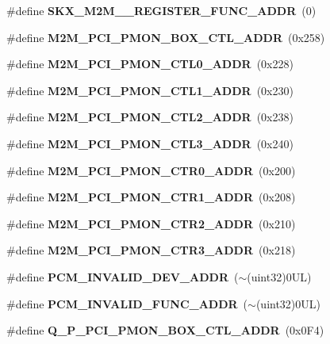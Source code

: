 \begin{DoxyCompactItemize}
\mbox{\label{types_8h_a770d64d720646aeb175e44d886acb365}} 
\#define {\bfseries S\+K\+X\+\_\+\+M2\+M\+\_\+\_\+\+R\+E\+G\+I\+S\+T\+E\+R\+\_\+\+F\+U\+N\+C\+\_\+\+A\+D\+DR}~(0)
\item 
\mbox{\label{types_8h_af57cf6bd9e16d3a69f2609ce1d9c52d2}} 
\#define {\bfseries M2\+M\+\_\+\+P\+C\+I\+\_\+\+P\+M\+O\+N\+\_\+\+B\+O\+X\+\_\+\+C\+T\+L\+\_\+\+A\+D\+DR}~(0x258)
\item 
\mbox{\label{types_8h_a2fd1d804ae58e1dd76bb7a8747714256}} 
\#define {\bfseries M2\+M\+\_\+\+P\+C\+I\+\_\+\+P\+M\+O\+N\+\_\+\+C\+T\+L0\+\_\+\+A\+D\+DR}~(0x228)
\item 
\mbox{\label{types_8h_afbdb676fd524636e2071b6ac344cd857}} 
\#define {\bfseries M2\+M\+\_\+\+P\+C\+I\+\_\+\+P\+M\+O\+N\+\_\+\+C\+T\+L1\+\_\+\+A\+D\+DR}~(0x230)
\item 
\mbox{\label{types_8h_ac98471928889a42dcc37caf390f34e93}} 
\#define {\bfseries M2\+M\+\_\+\+P\+C\+I\+\_\+\+P\+M\+O\+N\+\_\+\+C\+T\+L2\+\_\+\+A\+D\+DR}~(0x238)
\item 
\mbox{\label{types_8h_a18c0cb00defb1d08eaafc55696b66f56}} 
\#define {\bfseries M2\+M\+\_\+\+P\+C\+I\+\_\+\+P\+M\+O\+N\+\_\+\+C\+T\+L3\+\_\+\+A\+D\+DR}~(0x240)
\item 
\mbox{\label{types_8h_a9aeaaab44e8f6ee9b100d973892da3d7}} 
\#define {\bfseries M2\+M\+\_\+\+P\+C\+I\+\_\+\+P\+M\+O\+N\+\_\+\+C\+T\+R0\+\_\+\+A\+D\+DR}~(0x200)
\item 
\mbox{\label{types_8h_a84b869c68d5c487205ac3c03cacc83ac}} 
\#define {\bfseries M2\+M\+\_\+\+P\+C\+I\+\_\+\+P\+M\+O\+N\+\_\+\+C\+T\+R1\+\_\+\+A\+D\+DR}~(0x208)
\item 
\mbox{\label{types_8h_af8c47e57e2329802f469bb9cec83d887}} 
\#define {\bfseries M2\+M\+\_\+\+P\+C\+I\+\_\+\+P\+M\+O\+N\+\_\+\+C\+T\+R2\+\_\+\+A\+D\+DR}~(0x210)
\item 
\mbox{\label{types_8h_ac5be24dba43969087f2c2073b33a3039}} 
\#define {\bfseries M2\+M\+\_\+\+P\+C\+I\+\_\+\+P\+M\+O\+N\+\_\+\+C\+T\+R3\+\_\+\+A\+D\+DR}~(0x218)
\item 
\mbox{\label{types_8h_a3b37584ce2a36b7ce504a1633782cb31}} 
\#define {\bfseries P\+C\+M\+\_\+\+I\+N\+V\+A\+L\+I\+D\+\_\+\+D\+E\+V\+\_\+\+A\+D\+DR}~($\sim$(uint32)0\+U\+L)
\item 
\mbox{\label{types_8h_a96936cdb8dadecd666ea56dd0a221ca3}} 
\#define {\bfseries P\+C\+M\+\_\+\+I\+N\+V\+A\+L\+I\+D\+\_\+\+F\+U\+N\+C\+\_\+\+A\+D\+DR}~($\sim$(uint32)0\+U\+L)
\item 
\mbox{\label{types_8h_a6ccbec11cd5e24b282e3c196b53e94a0}} 
\#define {\bfseries Q\+\_\+\+P\+\_\+\+P\+C\+I\+\_\+\+P\+M\+O\+N\+\_\+\+B\+O\+X\+\_\+\+C\+T\+L\+\_\+\+A\+D\+DR}~(0x0\+F4)

\end{DoxyCompactItemize}
